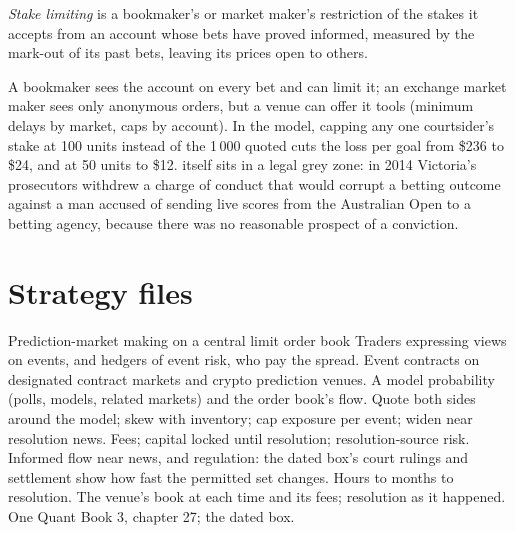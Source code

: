 \begin{definition}\label{def:hf:prediction-and-sports-market-making:limiting}
\emph{Stake limiting} is a bookmaker's or market maker's restriction of the stakes it accepts from an account whose bets have
proved informed, measured by the mark-out of its past bets, leaving its prices open to others.
\end{definition}

A bookmaker sees the account on every bet and can limit it; an exchange market maker sees only anonymous orders, but a venue can offer it tools
(minimum delays by market, caps by account). In the model, capping any one courtsider's stake at 100 units instead of the 1\,000 quoted cuts the loss
per goal from \$236 to \$24, and at 50 units to \$12.  itself sits in a legal grey zone: in 2014 Victoria's prosecutors withdrew a
charge of conduct that would corrupt a betting outcome against a man accused of sending live scores from the Australian Open to a betting agency,
because there was no reasonable prospect of a conviction.

\section{Strategy files}

\begin{strategyfile}{Prediction-market making on a central limit order book}\label{strat:hf:prediction-and-sports-market-making:clob}
 Traders expressing views on events, and hedgers of event risk, who pay the spread.
 Event contracts on designated contract markets and crypto prediction venues.
 A model probability (polls, models, related markets) and the order book's flow.
 Quote both sides around the model; skew with inventory; cap exposure per event; widen near resolution news.
 Fees; capital locked until resolution; resolution-source risk.
 Informed flow near news, and regulation: the dated box's court rulings and settlement show how fast the permitted set changes.
 Hours to months to resolution.
 The venue's book at each time and its fees; resolution as it happened.
 One Quant Book 3, chapter 27; the dated box.
\end{strategyfile}

